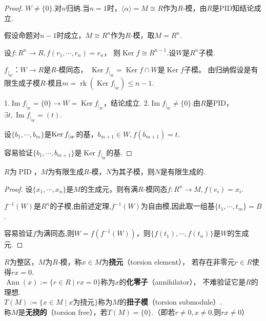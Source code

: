 \begin{proof}
	
	$W\neq\{0\}$.对$n$归纳.当$n=1$时，$\langle \alpha \rangle =M\cong R$作为$R$-模，由$R$是PID知结论成立.
	
	假设命题对$n-1$时成立，$M\cong R^n$作为$R$-模，取$M=R^n$.
	
	设$f:R^n\rightarrow R,f(r_1,\cdots,r_n)=r_n$，
    则$\operatorname{Ker}f\cong  R^{n-1}$.设$W$是$R^n$子模.
	
	$f_{|_W}：W\rightarrow R $是$R$-模同态，
    $\operatorname{Ker} f_{|_W}=\operatorname{Ker}f \cap W$是$\operatorname{Ker}f$子模。
    由归纳假设是有限生成子模$R$-模且$m=\operatorname{rk}(\operatorname{Ker} f_{|_W})\leq n-1$.
	
	1.$\operatorname{Im}f_{|_W}=\{0\}\rightarrow W=\operatorname{Ker} f_{|_W}$，结论成立.
	2.$\operatorname{Im}f_{|_W}\neq\{0\}$.由$R$是PID，$\exists t,\operatorname{Im}f_{|_W}=(t)$.
	
	设$\{b_1,\cdots,b_m\}$是$\operatorname{Ker} f_{|_W}$的基，$b_{m+1}\in W,f(b_{m+1})=t$.
	
	容易验证$\{b_1,\cdots,b_{m+1}\}$是$\operatorname{Ker}f_{|_W}$的基.
	
\end{proof}
    \begin{theorem}
        $R$为$\operatorname{PID}$，$M$为有限生成$R$-模，$N$为其子模，则$N$是有限生成的.
    \end{theorem}
\begin{proof}
	设$\{x_1,\cdots,x_n\}$是$M$的生成元，则有满$R$-模同态$f:R^n\rightarrow M,f(e_i)=x_i$.
	
	$f^{-1}(W)$是$R^n$的子模,由前述定理,$f^{-1}(W)$为自由模,因此取一组基$\{t_1,\cdots,t_m\}=B$.
	
	容易验证$f$为满同态,则$W=f(f^{-1}(W))$，则$\{f(t_1),\cdots,f(t_n)\}$是$W$的生成元.
	
\end{proof}
    \begin{definition}
        $R$为整区，$M$为$R$-模，称$x\in M$为\textbf{挠元}（torsion element），
        若存在非零元$r \in R$使得$rx=0$.\\
        $\operatorname{Ann}(x):=\{ r\in R\mid rx=0\}$称为$x$的\textbf{化零子}（annihilator），
        不难验证它是$R$的理想.\\
        $T(M):=\{ x\in M\mid x$为挠元$\}$称为$M$的\textbf{扭子模}（torsion submodule）.\\
        称$M$是\textbf{无挠的}（torsion free），若$T(M)=\{0\}$.（即若$r\neq0, x\neq 0$,则$rx\neq0$）

    \end{definition}
